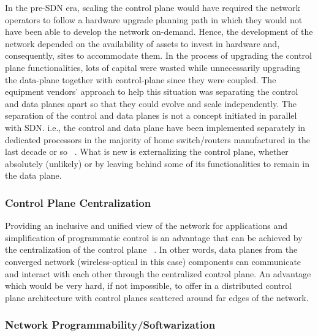 In the pre-\ac{SDN} era, scaling the control plane would have required the network operators to follow a hardware upgrade planning path in which they would not have been able to develop the network on-demand. %
Hence, the development of the network depended on the availability of assets to invest in hardware and, consequently, sites to accommodate them. In the process of upgrading the control plane functionalities, lots of capital were wasted while unnecessarily upgrading the data-plane together with control-plane since they were coupled. The equipment vendors' approach to help this situation was separating the control and data planes apart so that they could evolve and scale independently. The separation of the control and data planes is not a concept initiated in parallel with SDN. i.e., the control and data plane have been implemented separately in dedicated processors in the majority of home switch/routers manufactured in the last decade or so ~\cite{D.:2013:SSD:2566940}. What is new is externalizing the control plane, whether absolutely (unlikely) or by leaving behind some of its functionalities to remain in the data plane.

\subsubsection{Control Plane Centralization}

Providing an inclusive and unified view of the network for applications and simplification of programmatic control is an advantage that can be achieved by the centralization of the control plane ~\cite{D.:2013:SSD:2566940}. In other words, data planes from the converged network (wireless-optical in this case) components can communicate and interact with each other through the centralized control plane. An advantage which would be very hard, if not impossible, to offer in a distributed control plane architecture with control planes scattered around far edges of the network.

\subsubsection{Network Programmability/Softwarization}

